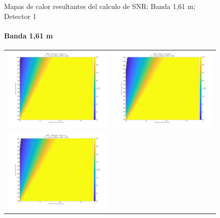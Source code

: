 \begin{landscape}
\begin{figure}[p]
\begin{tabular}{cc}
\end{tabular}
\caption{Mapas de calor resultantes del calculo de SNR: Banda 1,61 \textmu m; Detector 1}
\end{figure}
\end{landscape}


\begin{landscape}
\begin{figure}[p]
\centering
\setlength{\tabcolsep}{2pt}
\renewcommand{\arraystretch}{0}

\paragraph{Banda 1,61 \textmu m}
\begin{tabular}{cc}
\includegraphics[width=0.48\linewidth]{4.Payload/SNR/SNR_Lambda1_Detector2_Telescopio1_heatmap.jpg} &
\includegraphics[width=0.48\linewidth]{4.Payload/SNR/SNR_Lambda1_Detector2_Telescopio2_heatmap.jpg} \\
\includegraphics[width=0.48\linewidth]{4.Payload/SNR/SNR_Lambda1_Detector2_Telescopio3_heatmap.jpg} &

\end{tabular}
\end{figure}
\end{landscape}
